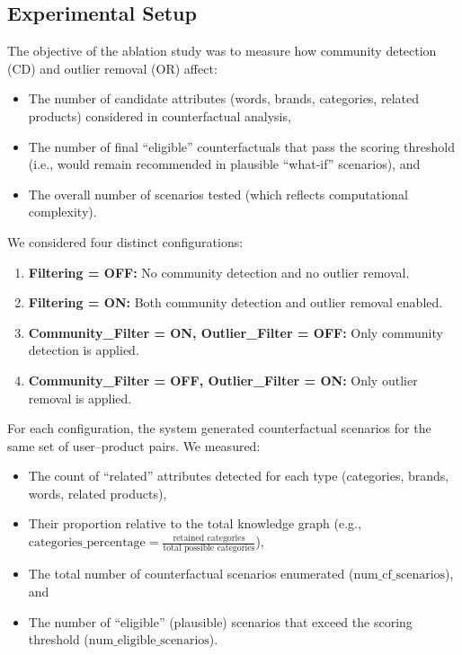 \subsection{Experimental Setup}
The objective of the ablation study was to measure how community detection (CD) and
outlier removal (OR) affect:

\begin{itemize}
	\item The number of candidate attributes (words, brands, categories, related products)
		considered in counterfactual analysis,

	\item The number of final “eligible” counterfactuals that pass the scoring threshold
		(i.e., would remain recommended in plausible “what-if” scenarios), and

	\item The overall number of scenarios tested (which reflects computational
		complexity).
\end{itemize}

We considered four distinct configurations:

\begin{enumerate}
	\item \textbf{Filtering = OFF:} No community detection and no outlier removal.

	\item \textbf{Filtering = ON:} Both community detection and outlier removal
		enabled.

	\item \textbf{Community\_Filter = ON, Outlier\_Filter = OFF:} Only community
		detection is applied.

	\item \textbf{Community\_Filter = OFF, Outlier\_Filter = ON:} Only outlier
		removal is applied.
\end{enumerate}

For each configuration, the system generated counterfactual scenarios for the
same set of user–product pairs. We measured:

\begin{itemize}
	\item The count of “related” attributes detected for each type (categories, brands,
		words, related products),

	\item Their proportion relative to the total knowledge graph (e.g.,
		$\text{categories\_percentage}= \frac{\text{retained categories}}{\text{total
		possible categories}}$),

	\item The total number of counterfactual scenarios enumerated ($\text{num\_cf\_scenarios}$),
		and

	\item The number of “eligible” (plausible) scenarios that exceed the scoring threshold
		($\text{num\_eligible\_scenarios}$).
\end{itemize}

